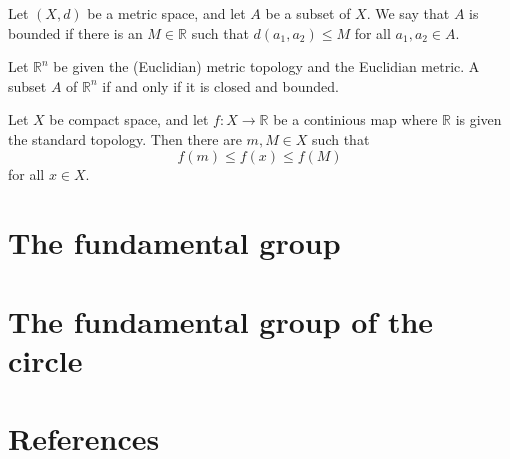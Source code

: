\documentclass{article}
\theoremstyle{remark}
\begin{document}
\begin{definition}

    Let $\left( X,d \right) $ be a metric space, and let $A$ be a subset of $X$. We say that $A$ is bounded if there is
    an $M  \in  \mathbb{R} $ such that $d\left( a_{1}, a_{2} \right) \le M$ for all $a_{1}, a_{2} \in  A$.

\end{definition}

\begin{theorem}
    Let $\mathbb{R} ^{n}$ be given the (Euclidian) metric topology and the Euclidian metric. A subset $A$ of $\mathbb{R}
    ^{n}$ if and only if it is closed and bounded.

\end{theorem}


\begin{theorem}

    Let $X$ be compact space, and let $f: X \to  \mathbb{R} $ be a continious map where $ \mathbb{R} $ is given the
    standard topology.  Then there are $m, M \in X $ such that \[
    f\left( m \right) \le f\left( x \right) \le f\left( M \right)
    \]
    for all $x \in   X$.
\end{theorem}
\section{ The fundamental group}%
\label{sec:the_fundamental_group}




\section{ The fundamental group of the circle}%
\label{sec:the_fundamental_group_of_the_circle}




\newpage
\section{References}%
\label{sec:references}



\end{document}
